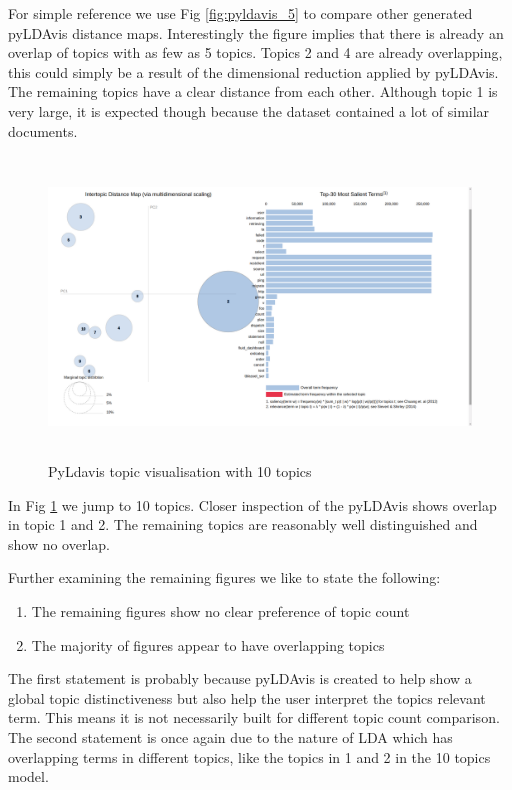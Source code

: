 For simple reference we use Fig \ref{fig:pyldavis_5} to compare other generated pyLDAvis distance maps. Interestingly the figure implies that there is already an overlap of topics with as few as 5 topics. Topics 2 and 4 are already overlapping, this could simply be a result of the dimensional reduction applied by pyLDAvis. The remaining topics have a clear distance from each other. Although topic 1 is very large, it is expected though because the dataset contained a lot of similar documents.

\begin{figure}[h]
    \centering
    \includegraphics[width=15cm, height=8cm,trim=0 0 100px 0, clip=true]{figures/pyldavis/pyldavis_10.png}
    \caption{PyLdavis topic visualisation with 10 topics}
    \label{fig:pyldavis_10}
\end{figure}

In Fig \ref{fig:pyldavis_10} we jump to 10 topics. Closer inspection of the pyLDAvis shows overlap in topic 1 and 2. The remaining topics are reasonably well distinguished and show no overlap. 

Further examining the remaining figures we like to state the following:
\begin{enumerate}
  \item The remaining figures show no clear preference of topic count
  \item The majority of figures appear to have overlapping topics
\end{enumerate}
The first statement is probably because pyLDAvis is created to help show a global topic distinctiveness but also help the user interpret the topics relevant term. This means it is not necessarily built for different topic count comparison. The second statement is once again due to the nature of LDA which has overlapping terms in different topics, like the topics in 1 and 2 in the 10 topics model.

